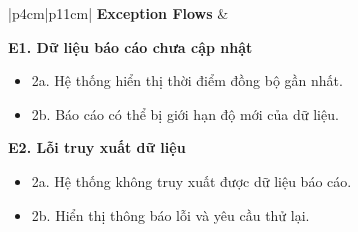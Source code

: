 \begin{longtable}{|p{4cm}|p{11cm}|}
\textbf{Exception Flows} &
\begin{minipage}[t]{\linewidth}
\vspace{0.3mm}

\textbf{E1. Dữ liệu báo cáo chưa cập nhật}
\begin{itemize}
\item 2a. Hệ thống hiển thị thời điểm đồng bộ gần nhất.
\item 2b. Báo cáo có thể bị giới hạn độ mới của dữ liệu.
\end{itemize}

\vspace{0.3mm}

\textbf{E2. Lỗi truy xuất dữ liệu}
\begin{itemize}
\item 2a. Hệ thống không truy xuất được dữ liệu báo cáo.
\item 2b. Hiển thị thông báo lỗi và yêu cầu thử lại.
\end{itemize}

\vspace{0.3mm}
\end{minipage}
\\ \hline

\end{longtable}

